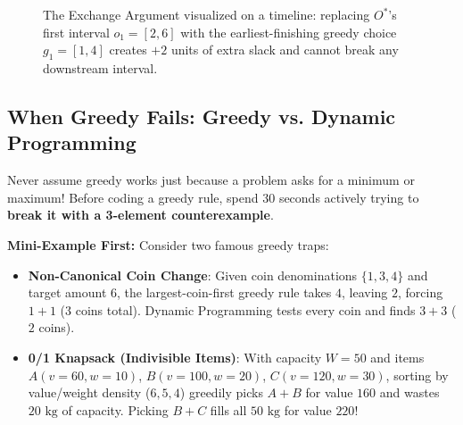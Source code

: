 \documentclass[11pt,a4paper]{article}
\theoremstyle{definition}
\newcommand{\examplebeat}{\textbf{\color{primaryblue}Mini-Example First:} }
\begin{document}
\begin{figure}[htbp]
\caption{The Exchange Argument visualized on a timeline: replacing $O^*$'s first interval $o_1 = [2, 6]$ with the earliest-finishing greedy choice $g_1 = [1, 4]$ creates $+2$ units of extra slack and cannot break any downstream interval.}
\label{fig:exchange_argument}
\end{figure}

\subsection{When Greedy Fails: Greedy vs. Dynamic Programming}

Never assume greedy works just because a problem asks for a minimum or maximum! Before coding a greedy rule, spend 30 seconds actively trying to \textbf{break it with a 3-element counterexample}.

\examplebeat Consider two famous greedy traps:
\begin{itemize}
    \item \textbf{Non-Canonical Coin Change}: Given coin denominations $\{1, 3, 4\}$ and target amount $6$, the largest-coin-first greedy rule takes $4$, leaving $2$, forcing $1 + 1$ ($3$ coins total). Dynamic Programming tests every coin and finds $3 + 3$ ($2$ coins).
    \item \textbf{0/1 Knapsack (Indivisible Items)}: With capacity $W = 50$ and items $A(v{=}60, w{=}10)$, $B(v{=}100, w{=}20)$, $C(v{=}120, w{=}30)$, sorting by value/weight density ($6, 5, 4$) greedily picks $A + B$ for value $160$ and wastes $20\text{ kg}$ of capacity. Picking $B + C$ fills all $50\text{ kg}$ for value $220$!
\end{itemize}
\end{document}
